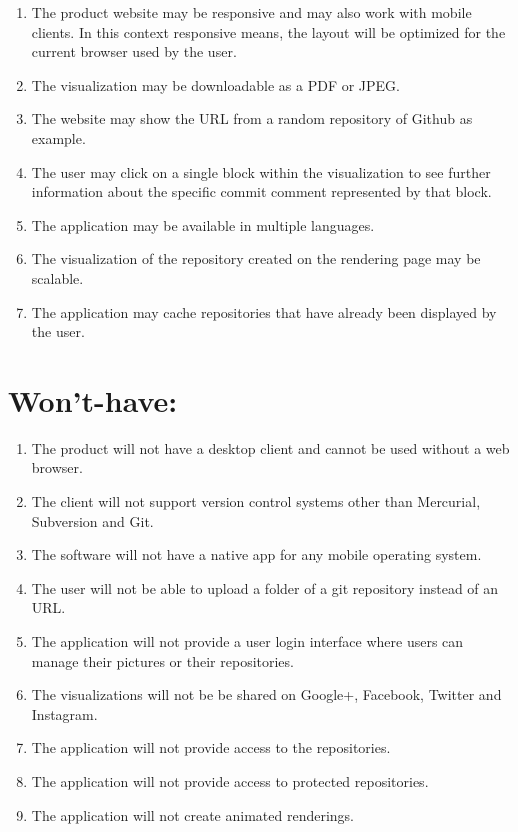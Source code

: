 \documentclass[12pt]{scrartcl}
\begin{document}
\begin{enumerate}
\item The product website may be responsive and may also work with mobile clients. In this context responsive means, the layout will be optimized for the current browser used by the user.
\item The visualization may be downloadable as a PDF or JPEG.
\item The website may show the URL from a random repository of Github as example. 
\item The user may click on a single block within the visualization to see further information about the specific commit comment represented by that block.
\item The application may be available in multiple languages.
\item The visualization of the repository created on the rendering page may be scalable.
\item The application may cache repositories that have already been displayed by the user.
\end{enumerate}
\section{Won't-have:}
\begin{enumerate}
\item The product will not have a desktop client and cannot be used without a web browser.
\item The client will not support version control systems other than Mercurial, Subversion and Git.
\item The software will not have a native app for any mobile operating system.
\item The user will not be able to upload a folder of a git repository instead of an URL.
\item The application will not provide a user login interface where users can manage their pictures or their repositories.
\item The visualizations will not be be shared on Google+, Facebook, Twitter and Instagram.
\item The application will not provide access to the repositories.
\item The application will not provide access to protected repositories.
\item The application will not create animated renderings.
\end{enumerate}
\end{document}
